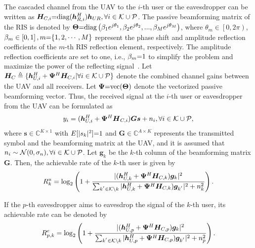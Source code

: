 \documentclass[12pt, draftclsnofoot, onecolumn]{IEEEtran}
\begin{document}
The cascaded channel from the UAV to the $i$-th user or the eavesdropper can be written as $ \bm{H}_{C,i}{\rm =}\text{diag}(\bm{h}_{R,i}^H)\bm{h}_{UR},\forall i \in {\cal K}\cup {\cal P}$. The passive beamforming matrix of the RIS is denoted by ${\bm{\Theta }} {\rm =} {\rm{diag}}\left( {{\beta _1}{e^{j{\theta _1}}},{\beta _2}{e^{j{\theta _2}}},...,{\beta _M}{e^{j{\theta _M}}}} \right)$, where ${\theta _m} \in \left[ {\left. {0,2\pi } \right)} \right.$, ${\beta _m} \in \left[ {0,1} \right], m {\rm =}\{1,2,\cdots ,M\}$ represent the phase shift and amplitude reflection coefficients of the $m$-th RIS reflection element, respectively. The amplitude reflection coefficients are set to one, i.e., ${\beta _m} {\rm =}1 $ to simplify the problem and maximize the power of the reflecting signal~\cite{secure-1}. Let ${\bm H}_{C}\triangleq \{{\bm h}_{U,i}^{H}+\bm{\Psi}^{H}\bm{H}_{C,i} |\forall i \in {\cal K}\cup {\cal P} \}$ denote the combined channel gains between the UAV and all receivers. Let $\bm{\Psi}{\rm =}\text{vec}(\bm{\Theta}) $ denote the vectorized passive beamforming vector. Thus, the received signal at the $i$-th user or eavesdropper from the UAV can be formulated as
\begin{equation}\label{received-1}
  y_i=({\bm{h}}_{U,i}^H+{\bm{\Psi}^{H}\bm{H}}_{C,i}){\bm{G}}{\bm{s}}+ {{n}_{i}},\forall i\in {\cal K}\cup{\cal P},
\end{equation}
\noindent where $ {\bm s}\in {\mathbb C}^{K\times 1}$ with $E[|s_k|^2]{\rm =}1 $ and $ {\bm{G}} \in \mathbb{C}^{{A} \times {K}}$ represents the transmitted symbol and the beamforming matrix at the UAV, and it is assumed that $ n_i \sim {\cal N}(0,\sigma_n),\forall i \in {\cal K}\cup {\cal P}$. Let $\bm{g}_k$ be the $k$-th column of the beamforming matrix $\bm{G}$. Then, the achievable rate of the $k$-th user is given by
\begin{equation}\label{unsecure-1}
  R_k^u = {\rm log}_2\left(1+\frac{|(\bm{h}_{U, k}^{H}+{\bm \Psi}^{H} \bm{H}_{C, k})\bm{g}_k|^2}{\sum_{k^{'} \in {\cal K}\backslash k}  | {}\bm{h}_{U, k}^{H}+{\bm \Psi}^{H} \bm{H}_{C, k})\bm{g}_{k^{'}} |^2+n_k^2}\right).
\end{equation}

If the $p$-th eavesdropper aims to eavesdrop the signal of the $k$-th user, its achievable rate can be denoted by 
\begin{equation}\label{eavesdrop-1}
  R_{p,k}^e = {\rm log}_2\left(1+\frac{|(\bm{h}_{U, p}^{H}+{\bm \Psi}^{H} \bm{H}_{C, p})\bm{g}_k|^2}{\sum_{k^{'} \in {\cal K}\backslash k}  | {}\bm{h}_{U, p}^{H}+{\bm \Psi}^{H} \bm{H}_{C, p})\bm{g}_{k^{'}} |^2+n_p^2}\right).
\end{equation}
\end{document}
